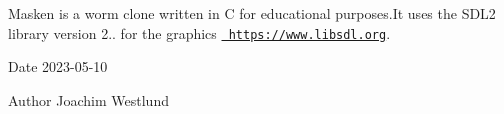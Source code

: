 Masken is a worm clone written in C for educational purposes.\+It uses the S\+D\+L2 library version 2.. for the graphics \href{https://www.libsdl.org}{\texttt{ https\+://www.\+libsdl.\+org}}.

\begin{DoxyDate}{Date}
2023-\/05-\/10 
\end{DoxyDate}
\begin{DoxyAuthor}{Author}
Joachim Westlund 
\end{DoxyAuthor}

